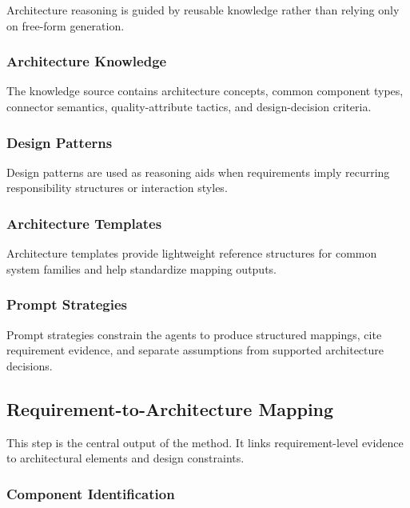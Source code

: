Architecture reasoning is guided by reusable knowledge rather than relying only on free-form generation.

\subsubsection{Architecture Knowledge}
\label{sec:method-architecture-knowledge}

The knowledge source contains architecture concepts, common component types, connector semantics, quality-attribute tactics, and design-decision criteria.

\subsubsection{Design Patterns}
\label{sec:method-design-patterns}

Design patterns are used as reasoning aids when requirements imply recurring responsibility structures or interaction styles.

\subsubsection{Architecture Templates}
\label{sec:method-architecture-templates}

Architecture templates provide lightweight reference structures for common system families and help standardize mapping outputs.

\subsubsection{Prompt Strategies}
\label{sec:method-prompt-strategies}

Prompt strategies constrain the agents to produce structured mappings, cite requirement evidence, and separate assumptions from supported architecture decisions.

\subsection{Requirement-to-Architecture Mapping}
\label{sec:method-mapping}

This step is the central output of the method.
It links requirement-level evidence to architectural elements and design constraints.

\subsubsection{Component Identification}
\label{sec:method-component-identification}

